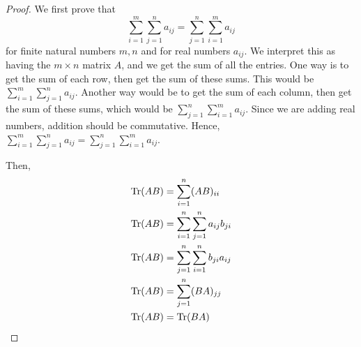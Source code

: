     \begin{proof}
        We first prove that \[\sum_{i = 1}^m \sum_{j = 1}^{n} a_{ij} = \sum_{j = 1}^n \sum_{i = 1}^m a_{ij}\] for finite natural numbers \(m, n\) and for real numbers \(a_{ij}\). We interpret this as having the \(m \times n\) matrix \(A\), and we get the sum of all the entries. One way is to get the sum of each row, then get the sum of these sums. This would be \(\displaystyle \sum_{i = 1}^m \sum_{j = 1}^n a_{ij}\). Another way would be to get the sum of each column, then get the sum of these sums, which would be \(\displaystyle \sum_{j = 1}^n \sum_{i = 1}^m a_{ij}\). Since we are adding real numbers, addition should be commutative. Hence, \(\displaystyle \sum_{i = 1}^m \sum_{j = 1}^{n} a_{ij} = \sum_{j = 1}^n \sum_{i = 1}^m a_{ij}\).

        Then,
        \begin{align*}
            \operatorname{Tr}(AB) &= \sum_{i = 1}^n (AB)_{ii} \\
            \operatorname{Tr}(AB) &= \sum_{i = 1}^n \sum_{j = 1}^n a_{ij}b_{ji} \\
            \operatorname{Tr}(AB) &= \sum_{j = 1}^n \sum_{i = 1}^n  b_{ji}a_{ij} \\
            \operatorname{Tr}(AB) &= \sum_{j = 1}^n (BA)_{jj} \\
            \operatorname{Tr}(AB) &= \operatorname{Tr}(BA)
        \end{align*}
    \end{proof}